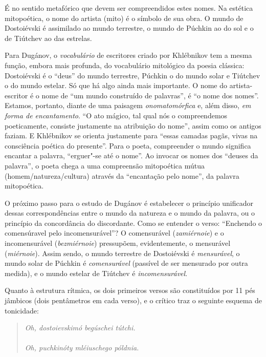 É no sentido metafórico que devem ser compreendidos estes nomes. Na
estética mitopoética, o nome do artista (mito) é o símbolo de sua obra. O mundo
de Dostoiévski é assimilado ao mundo terrestre, o mundo de Púchkin ao do sol e o de Tiútchev ao das estrelas. 

Para Dugánov, o \emph{vocabulário} de escritores criado por
Khlébnikov tem a mesma função, embora mais profunda, do vocabulário mitológico da poesia
clássica: Dostoiévski é o ``deus'' do mundo terrestre, Púchkin o do mundo solar e Tiútchev o do mundo estelar. Só que há algo ainda mais importante. O nome do artista-escritor é o nome de ``um mundo construído de palavras'', é ``o nome dos nomes''. Estamos, portanto,
diante de uma paisagem \emph{onomatomórfica} e, além disso,
\emph{em forma de encantamento}. ``O ato mágico, tal qual
nós o compreendemos poeticamente, consiste justamente na
atribuição do nome'', assim como os antigos faziam. E Khlébnikov se orienta justamente para
``essas camadas pagãs, vivas na consciência poética do presente''. Para o poeta,
compreender o mundo significa encantar a palavra, ``erguer"-se até o nome''.
Ao invocar os nomes dos ``deuses da palavra'', o poeta chega a uma compreensão mitopoética
mútua (homem/natureza/cultura) através da ``encantação pelo nome'', da palavra mitopoética.

O próximo passo para o estudo de Dugánov é estabelecer o princípio
unificador dessas correspondências entre o mundo da natureza e o mundo
da palavra, ou o princípio da concordância do discordante. Como se
entender o verso: ``Enchendo o comensúravel pelo incomensurável''? O
comensurável (\emph{zamiérnoie}) e o incomensurável (\emph{bezmiérnoie})
pressupõem, evidentemente, o mensurável (\emph{miérnoie}). Assim sendo,
o mundo terrestre de Dostoiévski é \emph{mensurável}, o mundo solar de
Púchkin é \emph{comensurável} (passível de ser mensurado por outra
medida), e o mundo estelar de Tiútchev é \emph{incomensurável}.

Quanto à estrutura rítmica, os dois primeiros versos são constituídos
por 11 pés jâmbicos (dois pentâmetros em cada verso), e o crítico traz o
seguinte esquema de tonicidade:

\begin{verse}
\emph{Oh, dostoievskimó begúschei tútchi.} \\
{} \\[8pt]
\emph{Oh, puchkinóty mléiuschego póldnia.} \\
{}
\end{verse}

